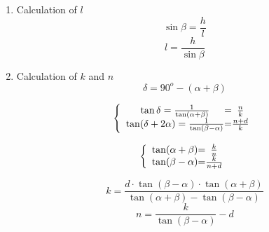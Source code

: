 \documentclass[12pt]{article}
\begin{document}
\begin{enumerate}
\item Calculation of $l$
	$$\sin{\beta}=\frac{h}{l}$$
	$$l=\frac{h}{\sin{\beta}}$$
\item Calculation of $k$ and $n$
	$$\delta=90^{o}-(\alpha+\beta)$$

	\[
	\left \{
	\begin{array}{c @{=} c}
    \tan\delta = \frac{1}{\tan(\alpha+\beta)}& \frac{n}{k} \\
   	\tan(\delta+2\alpha) = \frac{1}{\tan(\beta-\alpha)} & \frac{n+d}{k} \\
	\end{array}
	\right.
	\]
	
	\[
	\left \{
	\begin{array}{c @{=} c}
    \tan(\alpha+\beta)& \frac{k}{n} \\
   	\tan(\beta-\alpha) & \frac{k}{n+d} \\
	\end{array}
	\right.
	\]
	
	
\begin{equation} 	
	\boxed{k=\frac{d\cdot\tan(\beta-\alpha)\cdot\tan(\alpha+\beta)}{\tan(\alpha+\beta) - 	\tan(\beta-\alpha)}}
\end{equation}	
\begin{equation} 	
	\boxed{n=\frac{k}{\tan(\beta-\alpha)} - d}
	\end{equation}	
		

\end{enumerate}
\end{document}
